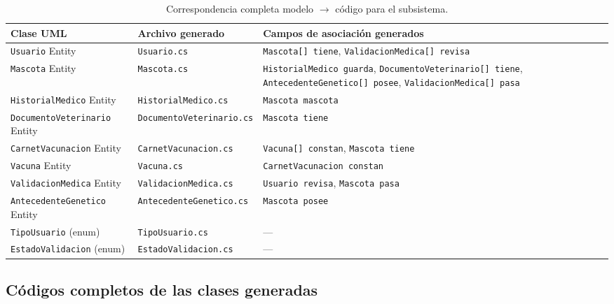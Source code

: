 \documentclass[journal,onecolumn]{IEEEtran}
\begin{document}
	\begin{table}[H]
		\caption{Correspondencia completa modelo $\to$ código para el subsistema.}
		\label{tab:mapeo_extenso}
		\centering
		\begin{tabularx}{\linewidth}{|L{3.5cm}|L{4cm}|X|}
			\hline
			\textbf{Clase UML} & \textbf{Archivo generado} & \textbf{Campos de asociación generados} \\
			\hline
			\texttt{Usuario} \guillemotleft Entity\guillemotright & \texttt{Usuario.cs} & \texttt{Mascota[] tiene}, \texttt{ValidacionMedica[] revisa} \\
			\hline
			\texttt{Mascota} \guillemotleft Entity\guillemotright & \texttt{Mascota.cs} & \texttt{HistorialMedico guarda}, \texttt{DocumentoVeterinario[] tiene}, \texttt{AntecedenteGenetico[] posee}, \texttt{ValidacionMedica[] pasa} \\
			\hline
			\texttt{HistorialMedico} \guillemotleft Entity\guillemotright & \texttt{HistorialMedico.cs} & \texttt{Mascota mascota} \\
			\hline
			\texttt{DocumentoVeterinario} \guillemotleft Entity\guillemotright & \texttt{DocumentoVeterinario.cs} & \texttt{Mascota tiene} \\
			\hline
			\texttt{CarnetVacunacion} \guillemotleft Entity\guillemotright & \texttt{CarnetVacunacion.cs} & \texttt{Vacuna[] constan}, \texttt{Mascota tiene} \\
			\hline
			\texttt{Vacuna} \guillemotleft Entity\guillemotright & \texttt{Vacuna.cs} & \texttt{CarnetVacunacion constan} \\
			\hline
			\texttt{ValidacionMedica} \guillemotleft Entity\guillemotright & \texttt{ValidacionMedica.cs} & \texttt{Usuario revisa}, \texttt{Mascota pasa} \\
			\hline
			\texttt{AntecedenteGenetico} \guillemotleft Entity\guillemotright & \texttt{AntecedenteGenetico.cs} & \texttt{Mascota posee} \\
			\hline
			\texttt{TipoUsuario} (enum) & \texttt{TipoUsuario.cs} & --- \\
			\hline
			\texttt{EstadoValidacion} (enum) & \texttt{EstadoValidacion.cs} & --- \\
			\hline
		\end{tabularx}
	\end{table}
	
	\newpage
	
	\subsection*{Códigos completos de las clases generadas}\label{sec:anexo_codigo}
	
\end{document}

